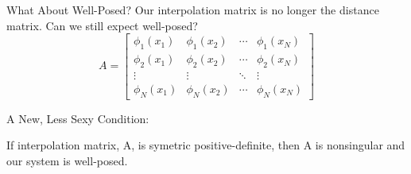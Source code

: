 \documentclass[12pt,t]{beamer}
\newcommand{\subt}[1]{{\footnotesize \color{subtitle} {#1}}}
\begin{document}
\begin{frame}{What About Well-Posed?}
Our interpolation matrix is no longer the distance matrix. Can we still expect well-posed?
\begin{equation*}
A=
\begin{bmatrix}
\phi_1(x_1) & \phi_1(x_2) & \cdots & \phi_1(x_N)\\
\phi_2(x_1) & \phi_2(x_2)& \cdots & \phi_2(x_N)\\
\vdots & \vdots & \ddots & \vdots\\
\phi_N(x_1) & \phi_N(x_2)& \cdots & \phi_N(x_N)
\end{bmatrix}
\end{equation*}

\subt{A New, Less Sexy Condition:}

If interpolation matrix, A, is symetric \subt{positive-definite}, then A is nonsingular and our system is well-posed.

\note{}
\end{frame}
\end{document}
